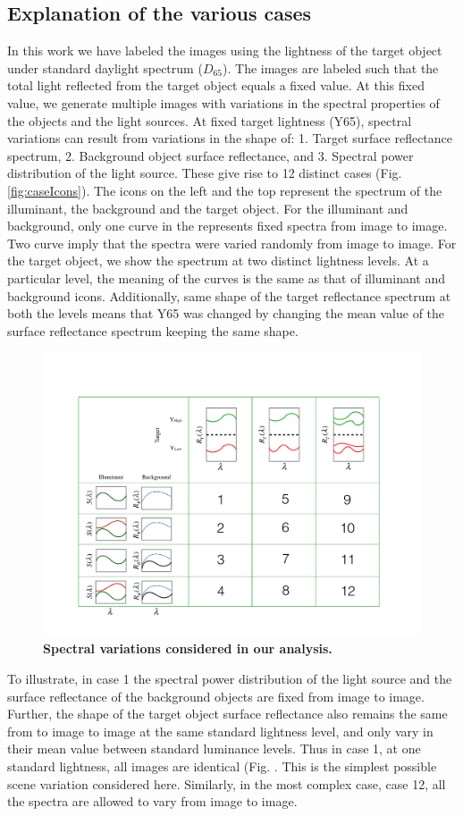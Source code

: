 \documentclass{jov}
\begin{document}
\subsection{Explanation of the various cases}
In this work we have labeled the images using the lightness of the target object under  standard daylight spectrum ($D_65$). The images are labeled such that the total light reflected from the target object equals a fixed value. At this fixed value, we generate multiple images with variations in the spectral properties of the objects and the light sources. At fixed target lightness (Y65), spectral variations can result from variations in the shape of: 1. Target surface reflectance spectrum, 2. Background object surface reflectance, and 3. Spectral power distribution of the light source. These give rise to 12 distinct cases (Fig. \ref{fig:caseIcons}). The icons on the left and the top represent the spectrum of the illuminant, the background and the target object. For the illuminant and background, only one curve in the represents fixed spectra from image to image. Two curve imply that the spectra were varied randomly from image to image. For the target object, we show the spectrum at two distinct lightness levels. At a particular level, the meaning of the curves is the same as that of illuminant and background icons. Additionally, same shape of the target reflectance spectrum at both the levels means that Y65 was changed by changing the mean value of the surface reflectance spectrum keeping the same shape.

\begin{figure}
\centering
	\includegraphics[width=0.6 \textwidth]{cases.pdf}
    \caption{\bf{Spectral variations considered in our analysis.} }
    \label{fig:casesIcons}
\end{figure}

To illustrate, in case 1 the spectral power distribution of the light source and the surface reflectance of the background objects are fixed from image to image. Further, the shape of the target object surface reflectance also remains the same from to image to image at the same standard lightness level, and only vary in their mean value between standard luminance levels. Thus in case 1, at one standard lightness, all images are identical (Fig. . This is the simplest possible scene variation considered here. Similarly, in the most complex case, case 12, all the spectra are allowed to vary from image to image. 





\end{document}
